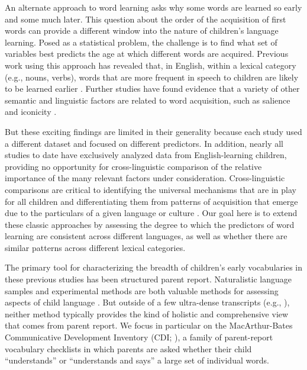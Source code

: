 \documentclass[
   11pt,
       ]{book}
\begin{document}
An alternate approach to word learning asks why some words are learned so early and some much later. This question about the order of the acquisition of first words can provide a different window into the nature of children's language learning. Posed as a statistical problem, the challenge is to find what set of variables best predicts the age at which different words are acquired. Previous work using this approach has revealed that, in English, within a lexical category (e.g., nouns, verbs), words that are more frequent in speech to children are likely to be learned earlier \citep{goodman2008}. Further studies have found evidence that a variety of other semantic and linguistic factors are related to word acquisition, such as salience and iconicity \citep{hills2009,stokes2010,perry2015,roy2015,swingley2017}.

But these exciting findings are limited in their generality because each study used a different dataset and focused on different predictors. In addition, nearly all studies to date have exclusively analyzed data from English-learning children, providing no opportunity for cross-linguistic comparison of the relative importance of the many relevant factors under consideration. Cross-linguistic comparisons are critical to identifying the universal mechanisms that are in play for all children and differentiating them from patterns of acquisition that emerge due to the particulars of a given language or culture \citep{slobin1985,bates1987}. Our goal here is to extend these classic approaches by assessing the degree to which the predictors of word learning are consistent across different languages, as well as whether there are similar patterns across different lexical categories.

The primary tool for characterizing the breadth of children's early vocabularies in these previous studies has been structured parent report. Naturalistic language samples and experimental methods are both valuable methods for assessing aspects of child language \citep{bornstein1998,fernald2006}. But outside of a few ultra-dense transcripts (e.g., \citealp{roy2015}), neither method typically provides the kind of holistic and comprehensive view that comes from parent report. We focus in particular on the MacArthur-Bates Communicative Development Inventory (CDI; \citealp{fenson2007}), a family of parent-report vocabulary checklists in which parents are asked whether their child ``understands'' or ``understands and says'' a large set of individual words.
\end{document}
